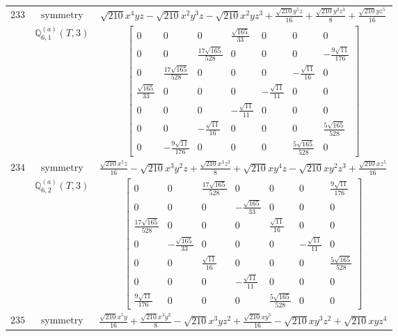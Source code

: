 \documentclass[fleqn,8pt,landscape]{jsarticle}
\begin{document}
\begin{longtable}{ccc}
$ 233 $ & $ \text{symmetry} $ & $ \sqrt{210} x^{4} y z - \sqrt{210} x^{2} y^{3} z - \sqrt{210} x^{2} y z^{3} + \frac{\sqrt{210} y^{5} z}{16} + \frac{\sqrt{210} y^{3} z^{3}}{8} + \frac{\sqrt{210} y z^{5}}{16} $ \\
$  $ & $ \mathbb{Q}_{6,1}^{(a)}(T,3) $ & $ \begin{bmatrix} 0 & 0 & 0 & \frac{\sqrt{165}}{33} & 0 & 0 & 0 \\ 0 & 0 & \frac{17 \sqrt{165}}{528} & 0 & 0 & 0 & - \frac{9 \sqrt{11}}{176} \\ 0 & \frac{17 \sqrt{165}}{528} & 0 & 0 & 0 & - \frac{\sqrt{11}}{16} & 0 \\ \frac{\sqrt{165}}{33} & 0 & 0 & 0 & - \frac{\sqrt{11}}{11} & 0 & 0 \\ 0 & 0 & 0 & - \frac{\sqrt{11}}{11} & 0 & 0 & 0 \\ 0 & 0 & - \frac{\sqrt{11}}{16} & 0 & 0 & 0 & \frac{5 \sqrt{165}}{528} \\ 0 & - \frac{9 \sqrt{11}}{176} & 0 & 0 & 0 & \frac{5 \sqrt{165}}{528} & 0 \end{bmatrix} $ \\ \hline
$ 234 $ & $ \text{symmetry} $ & $ \frac{\sqrt{210} x^{5} z}{16} - \sqrt{210} x^{3} y^{2} z + \frac{\sqrt{210} x^{3} z^{3}}{8} + \sqrt{210} x y^{4} z - \sqrt{210} x y^{2} z^{3} + \frac{\sqrt{210} x z^{5}}{16} $ \\
$  $ & $ \mathbb{Q}_{6,2}^{(a)}(T,3) $ & $ \begin{bmatrix} 0 & 0 & \frac{17 \sqrt{165}}{528} & 0 & 0 & 0 & \frac{9 \sqrt{11}}{176} \\ 0 & 0 & 0 & - \frac{\sqrt{165}}{33} & 0 & 0 & 0 \\ \frac{17 \sqrt{165}}{528} & 0 & 0 & 0 & \frac{\sqrt{11}}{16} & 0 & 0 \\ 0 & - \frac{\sqrt{165}}{33} & 0 & 0 & 0 & - \frac{\sqrt{11}}{11} & 0 \\ 0 & 0 & \frac{\sqrt{11}}{16} & 0 & 0 & 0 & \frac{5 \sqrt{165}}{528} \\ 0 & 0 & 0 & - \frac{\sqrt{11}}{11} & 0 & 0 & 0 \\ \frac{9 \sqrt{11}}{176} & 0 & 0 & 0 & \frac{5 \sqrt{165}}{528} & 0 & 0 \end{bmatrix} $ \\ \hline
$ 235 $ & $ \text{symmetry} $ & $ \frac{\sqrt{210} x^{5} y}{16} + \frac{\sqrt{210} x^{3} y^{3}}{8} - \sqrt{210} x^{3} y z^{2} + \frac{\sqrt{210} x y^{5}}{16} - \sqrt{210} x y^{3} z^{2} + \sqrt{210} x y z^{4} $ \\

\end{longtable}
\end{document}

